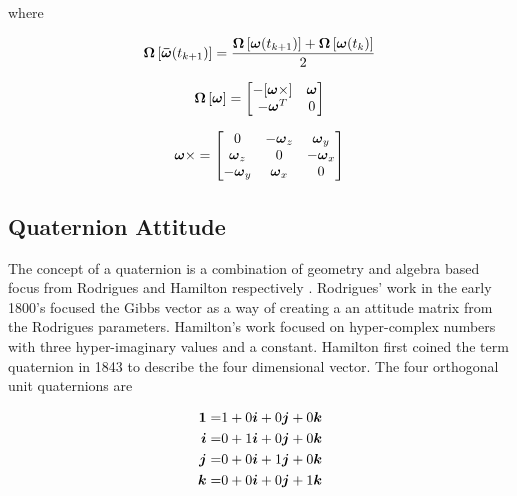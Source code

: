 where

\begin{equation}
    \boldsymbol{\Omega} \left[ \boldsymbol{\bar{\omega}}(t_{k+1}) \right] = \frac{\boldsymbol{\Omega} \left[\boldsymbol{\omega}(t_{k+1}) \right] + \boldsymbol{\Omega} \left[\boldsymbol{\omega}(t_{k}) \right]}{2}
    \label{eqn:DiscreteQuaternionToBodyRate}
\end{equation}

\begin{equation}
  \boldsymbol{\Omega} \left[ \boldsymbol{\omega} \right] =
  \begin{bmatrix}
    - [ \boldsymbol{\omega} \times ] & \boldsymbol{\omega} \\
    - \boldsymbol{\omega}^T & 0 \\
  \end{bmatrix}
  \label{eqn:OmegaMatrix}
\end{equation}

\begin{equation}
  \boldsymbol{\omega} \times =
  \begin{bmatrix}
    0 & -\boldsymbol{\omega}_z & \boldsymbol{\omega}_y \\
    \boldsymbol{\omega}_z & 0 & -\boldsymbol{\omega}_x \\
    -\boldsymbol{\omega}_y & \boldsymbol{\omega}_x & 0 \\
  \end{bmatrix}
\end{equation}


\subsection{Quaternion Attitude}
\label{subsec:QuaternionAttitude}

The concept of a quaternion is a combination of geometry and algebra based focus from Rodrigues and Hamilton respectively \cite{shuster}.  Rodrigues' work in the early 1800's focused the Gibbs vector as a way of creating a an attitude matrix from the Rodrigues parameters.  Hamilton's work focused on hyper-complex numbers with three hyper-imaginary values and a constant.  Hamilton first coined the term quaternion in 1843 to describe the four dimensional vector.  The four orthogonal unit quaternions are

\begin{subequations}
  \begin{align}
    \boldsymbol{1} = & 1 + 0\boldsymbol{i} + 0\boldsymbol{j} + 0\boldsymbol{k} \\
    \boldsymbol{i} = & 0 + 1\boldsymbol{i} + 0\boldsymbol{j} + 0\boldsymbol{k} \\
    \boldsymbol{j} = & 0 + 0\boldsymbol{i} + 1\boldsymbol{j} + 0\boldsymbol{k} \\
    \boldsymbol{k} = & 0 + 0\boldsymbol{i} + 0\boldsymbol{j} + 1\boldsymbol{k}
  \end{align}
  \label{eqn:UnitQuaternions}
\end{subequations}

